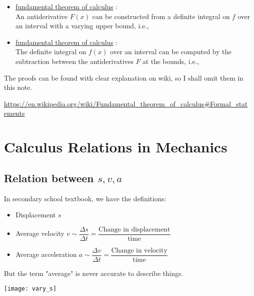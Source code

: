 \documentclass[class=article, crop=false, 12pt]{standalone}
\begin{document}
\begin{itemize}
    \item \ul{ fundamental theorem of calculus}  : \\[1em]
    An antiderivative $F(x)$ can be constructed from a definite integral on $f$ over an interval with a varying upper bound, i.e.,

    \item \ul{ fundamental theorem of calculus}  : \\[1em]
    The definite integral on $f(x)$ over an interval can be computed by the subtraction between the antiderivatives $F$ at the bounds, i.e.,
\end{itemize}

The proofs can be found with clear explanation on wiki, so I shall omit them in this note.

\url{https://en.wikipedia.org/wiki/Fundamental_theorem_of_calculus#Formal_statements}




\linesep
\section{Calculus Relations in Mechanics}


\subsection{Relation between $s,v,a$}

In secondary school textbook, we have the definitions:

\begin{itemize}
    \item Displacement $s$ 
    \item Average velocity $v \sim  \dfrac{\Delta s}{\Delta t} = \dfrac{\text{Change in displacement}}{\text{time}}$
    \item Average acceleration $a \sim \dfrac{\Delta v}{\Delta t} = \dfrac{\text{Change in velocity}}{\text{time}}$
\end{itemize}

But the term "average" is never accurate to describe things.

\begin{center}
    \begin{minipage}{0.3\linewidth}
        \centering
        \texttt{[image: vary\_s]}
    \end{minipage}
    \hspace{0.05\textwidth}
    \begin{minipage}{0.4\linewidth}
        \centering
    \end{minipage}
\end{center}
\end{document}
